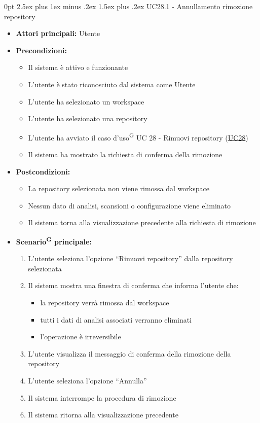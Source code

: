 \documentclass[a4paper, 11pt]{article}
\makeatletter
\renewcommand\paragraph{\@startsection{paragraph}{4}
  {0pt}
  {2.5ex plus 1ex minus .2ex}
  {1.5ex plus .2ex}
  {\normalfont\normalsize\bfseries\color{AccentDark}}}
\makeatother
\begin{document}
\paragraph{UC28.1 - Annullamento rimozione repository} \label{UC28.1}
\begin{itemize}
	\item \textbf{Attori principali:} Utente
	\item \textbf{Precondizioni:}
	\begin{itemize}
		\item Il sistema è attivo e funzionante
		\item L'utente è stato riconosciuto dal sistema come Utente
		\item L'utente ha selezionato un workspace
		\item L'utente ha selezionato una repository
		\item L'utente ha avviato il caso d'uso\textsuperscript{G} UC 28 - Rimuovi repository (\hyperref[UC28]{UC28})
		\item Il sistema ha mostrato la richiesta di conferma della rimozione
	\end{itemize}
	\item \textbf{Postcondizioni:}
	\begin{itemize}
		\item La repository selezionata non viene rimossa dal workspace
		\item Nessun dato di analisi, scansioni o configurazione viene eliminato
		\item Il sistema torna alla visualizzazione precedente alla richiesta di rimozione
	\end{itemize}
	\item \textbf{Scenario\textsuperscript{G} principale:}
	\begin{enumerate}
		\item L'utente seleziona l'opzione “Rimuovi repository” dalla repository selezionata
		\item Il sistema mostra una finestra di conferma che informa l'utente che:
		\begin{itemize}
			\item la repository verrà rimossa dal workspace
			\item tutti i dati di analisi associati verranno eliminati
			\item l'operazione è irreversibile
		\end{itemize}
		\item L'utente visualizza il messaggio di conferma della rimozione della repository
		\item L'utente seleziona l'opzione “Annulla”
		\item Il sistema interrompe la procedura di rimozione
		\item Il sistema ritorna alla visualizzazione precedente
	\end{enumerate}
\end{itemize}
\end{document}
